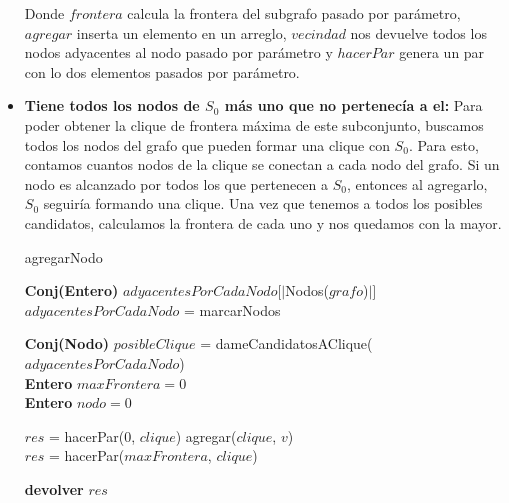 \begin{itemize}
Donde $frontera$ calcula la frontera del subgrafo pasado por parámetro, $agregar$ inserta un elemento en un arreglo, $vecindad$ nos devuelve todos los nodos adyacentes al nodo pasado por parámetro y $hacerPar$ genera un par con lo dos elementos pasados por parámetro. \newline


\item \textbf{Tiene todos los nodos de $S_{0}$ más uno que no pertenecía a el:} \newline
Para poder obtener la clique de frontera máxima de este subconjunto, buscamos todos los nodos del grafo que pueden formar una clique con $S_{0}$. Para esto, contamos cuantos nodos de la clique se conectan a cada nodo del grafo. Si un nodo es alcanzado por todos los que pertenecen a $S_{0}$, entonces al agregarlo, $S_{0}$ seguiría formando una clique. Una vez que tenemos a todos los posibles candidatos, calculamos la frontera de cada uno y nos quedamos con la mayor. \newline

\begin{algorithm}[H]
    \SetAlgoLined
    \caption{agregarNodo}
	
    \textbf{Conj(Entero)} $adyacentesPorCadaNodo[|$Nodos($grafo$)$|]$  \\
	
    $adyacentesPorCadaNodo$ = marcarNodos
	
    \textbf{Conj(Nodo)} $posibleClique$ = dameCandidatosAClique($adyacentesPorCadaNodo$)\\
   
    \textbf{Entero} $maxFrontera = 0$ \\
    \textbf{Entero} $nodo = 0$ \\



	{$res$ = hacerPar(0, $clique$)}
    {	agregar($clique$, $v$) \\
	$res$ = hacerPar($maxFrontera$, $clique$) }

    \textbf{devolver} $res$ \\
\end{algorithm}


\end{itemize}
